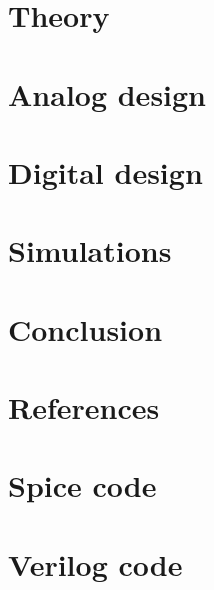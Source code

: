 \documentclass[a4paper, 11pt, english]{article}
\begin{document}
\newpage
\section{Theory} \label{sec:Theory}


\newpage
\section{Analog design} \label{sec:AnalogDesign}


\newpage
\section{Digital design} \label{sec:DigitalDesign}


\newpage
\section{Simulations} \label{sec:Simulations}


\newpage
\section{Conclusion} \label{sec:Conclusion}


\newpage
\section{References} \label{sec:References}
\printbibliography



\newpage
\begin{appendices}
  
  
  \section{Spice code} \label{ap:SpiceCode}
  
  \newpage
  \section{Verilog code} \label{ap:VerilogCode}
  
  
  
  
  
  
\end{appendices}
\end{document}
